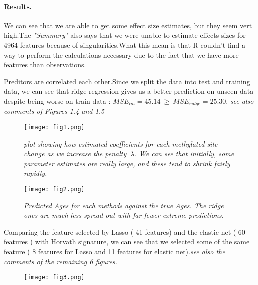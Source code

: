 \documentclass[12pt]{report}
\begin{document}
\paragraph{Results.}
\begin{itemize}
	{\small	\item[1)] We can see  that we are able to get some effect size estimates, but they seem vert high.The \textit{"Summary"} also says that we were unable to estimate effects sizes for 4964 features because of  singularities.What this mean is that R couldn't find a way to perform the calculations necessary due to the fact that we have more features than observations.
		\item[2)] Preditors are correlated each other.Since we split the data into test and training data, we can see that ridge regression gives us a better prediction on unseen data despite being worse on train data : $MSE_{lm}=45.14 \ \geq\ MSE_{ridge}=25.30 $. \textit{see also comments of Figures 1.4 and 1.5}
	 }

	\begin{figure}[b]
		\begin{minipage}[c]{0.49\textwidth}
			\centering
			\texttt{[image: fig1.png]}
			
			\caption[plot showing how estimated coefficients for each methylated site change]{\textit{plot showing how estimated coefficients for each methylated site change as we increase the penalty $\ \lambda$. We can see that initially, some parameter estimates are really large, and these tend to shrink fairly rapidly.} }
		\end{minipage}
		\hfill
		\begin{minipage}[c]{0.49\textwidth}
			\centering
			\texttt{[image: fig2.png]}
			\caption[Predicted Ages for each methods against the true Ages]{\textit{Predicted Ages for each methods against the true Ages. The ridge ones are much less spread out with far fewer extreme predictions.}}
		\end{minipage}
	\end{figure}
{\small	\item[3)] Comparing the feature selected by Lasso ( 41 features) and the elastic net ( 60 features ) with Horvath signature, we can see that we selected some of the same feature ( 8 features for Lasso and 11 features for elastic net).\textit{see also the comments of the remaining 6 figures.} }
	\begin{figure}
		\begin{minipage}[c]{0.49\textwidth}
			\centering
			\texttt{[image: fig3.png]}
			

\end{minipage}
\end{figure}
\end{itemize}
\end{document}
